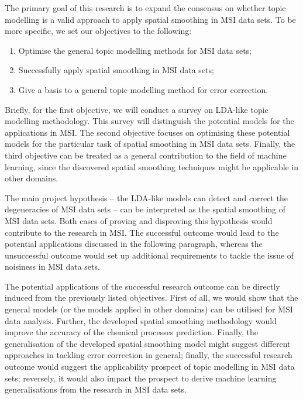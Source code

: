 \documentclass{mprop}
\begin{document}
\par The primary goal of this research is to expand the consensus on whether topic modelling is a valid approach to apply spatial smoothing in MSI data sets. To be more specific, we set our objectives to the following:
\begin{enumerate}
    \item Optimise the general topic modelling methods for MSI data sets;
    \item Successfully apply spatial smoothing in MSI data sets;
    \item Give a basis to a general topic modelling method for error correction.
\end{enumerate}
Briefly, for the first objective, we will conduct a survey on LDA-like topic modelling methodology. This survey will distinguish the potential models for the applications in MSI. The second objective focuses on optimising these potential models for the particular task of spatial smoothing in MSI data sets. Finally, the third objective can be treated as a general contribution to the field of machine learning, since the discovered spatial smoothing techniques might be applicable in other domains. 

\par The main project hypothesis -- the LDA-like models can detect and correct the degeneracies of MSI data sets -- can be interpreted as the spatial smoothing of MSI data sets. Both cases of proving and disproving this hypothesis would contribute to the research in MSI. The successful outcome would lead to the potential applications discussed in the following paragraph, whereas the unsuccessful outcome would set up additional requirements to tackle the issue of noisiness in MSI data sets.

\par The potential applications of the successful research outcome can be directly induced from the previously listed objectives. First of all, we would show that the general models (or the models applied in other domains) can be utilised for MSI data analysis. Further, the developed spatial smoothing methodology would improve the accuracy of the chemical processes prediction. Finally, the generalisation of the developed spatial smoothing model might suggest different approaches in tackling error correction in general; finally, the successful research outcome would suggest the applicability prospect of topic modelling in MSI data sets; reversely, it would also impact the prospect to derive machine learning generalisations from the research in MSI data sets.  
\end{document}
